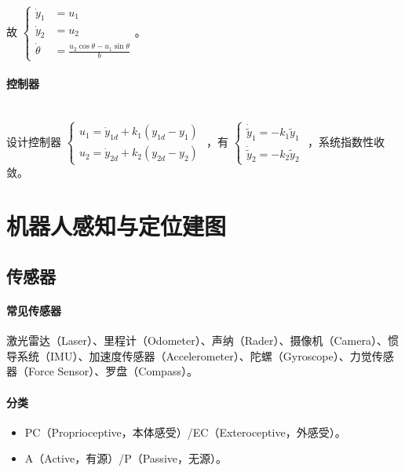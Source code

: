\documentclass[
12pt, %
a4paper, 
oneside, %
headinclude,footinclude, %
]{scrartcl}
\begin{document}
故
$
\begin{cases}
\dot{y}_1 &= u_1 \\
\dot{y}_2 &= u_2 \\
\dot{\theta} &= \frac{u_2 \cos\theta - u_1 \sin\theta}{b}
\end{cases}
$。
\paragraph{控制器}~\\

设计控制器
$ 
\begin{cases}
u_1 = \dot{y}_{1d} + k_1(y_{1d} - y_1) \\
u_2 = \dot{y}_{2d} + k_2(y_{2d} - y_2)
\end{cases} 
$
，有
$
\begin{cases}
\dot{\tilde{y}}_1 = -k_1\tilde{y}_1 \\
\dot{\tilde{y}}_2 = -k_2\tilde{y}_2
\end{cases}
$
，系统指数性收敛。
\section{机器人感知与定位建图}
\subsection[传感器]{传感器}
\paragraph{常见传感器}
激光雷达（Laser）、里程计（Odometer）、声纳（Rader）、摄像机（Camera）、惯导系统（IMU）、加速度传感器（Accelerometer）、陀螺（Gyroscope）、力觉传感器（Force Sensor）、罗盘（Compass）。
\paragraph{分类}
\begin{itemize}
\item PC（Proprioceptive，本体感受）/EC（Exteroceptive，外感受）。
\item A（Active，有源）/P（Passive，无源）。
\end{itemize}
\end{document}
